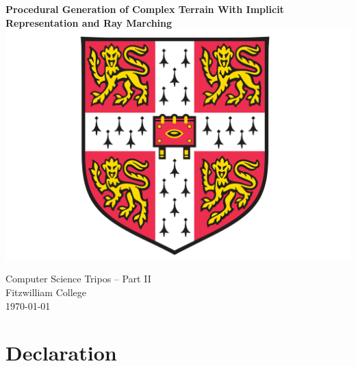 \documentclass[12pt,a4paper,twoside,openright]{report}
\begin{document}



\pagestyle{empty}


\vspace*{25mm}
\begin{center}
	\Huge
	\textbf{Procedural Generation of Complex Terrain With Implicit Representation and Ray Marching} \\[20mm]

	\vspace{-2mm}
	\includegraphics[scale=0.45]{./figures/crest.png}
	\hspace{0mm}\\[20mm]
	\vspace{2mm}


	\LARGE
	Computer Science Tripos -- Part II \\[1mm]
	Fitzwilliam College \\[20mm]

	\Large
	\today
\end{center}

\newpage
\thispagestyle{empty}


\pagestyle{plain}


\section*{Declaration}
\end{document}
